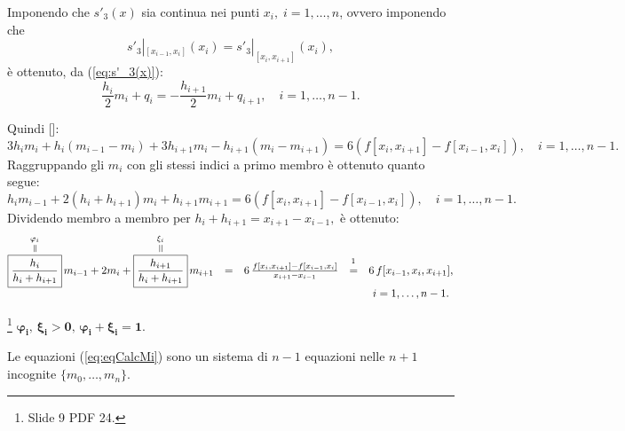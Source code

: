 Imponendo che $s'_3(x)$ sia continua nei punti $x_i,\; i=1,\hdots,n$, ovvero imponendo che
\begin{equation*}
    s'_3|_{[x_{i-1}, x_i]}(x_i)=s'_3|_{[x_i, x_{i+1}]}(x_i),
\end{equation*}
è ottenuto, da (\ref{eq:s'_3(x)}):
\begin{equation*}
    \frac{h_i}{2}m_i+q_i=-\frac{h_{i+1}}{2}m_i+q_{i+1},\quad i=1,\hdots,n-1.
\end{equation*}

Quindi [\footnotemark]:
\begin{equation*}
    3h_im_i+h_i(m_{i-1}-m_i)+3h_{i+1}m_i-h_{i+1}(m_i-m_{i+1})=6\left(f[x_i,x_{i+1}]-f[x_{i-1},x_i]\right),\quad i=1,\hdots,n-1.
\end{equation*}
Raggruppando gli $m_i$ con gli stessi indici a primo membro è ottenuto quanto segue:
\begin{equation*}
    h_im_{i-1}+2(h_i+h_{i+1})m_i+h_{i+1}m_{i+1}=6(f[x_i,x_{i+1}]-f[x_{i-1},x_i]),\quad i=1,\hdots,n-1.
\end{equation*}
Dividendo membro a membro per $h_i+h_{i+1}=x_{i+1}-x_{i-1},$ è ottenuto:
\begin{equation}\label{eq:eqCalcMi}
    \begin{matrix}
        \equaltoup{\boxed{\frac{h_i}{h_i+h_{i+1}}}}{\varphi_i}\,m_{i-1}+2m_i+\equaltoup{\boxed{\frac{h_{i+1}}{h_i+h_{i+1}}}}{\xi_i}\,m_{i+1}&=&6\,\frac{f[x_i,x_{i+1}]-f[x_{i-1},x_i]}{x_{i+1}-x_{i-1}}&\overset{\footnotemark}{=}&6\,f[x_{i-1},x_i,x_{i+1}],\\
        && && i=1,\hdots,n-1.
    \end{matrix}
\end{equation} 

\begin{remark}\label{re:varphi+xi=1}\footnote{Slide 9 PDF 24.}
    $\boldsymbol{\varphi_i,\, \xi_i>0,\, \varphi_i+\xi_i=1.}$
\end{remark}

Le equazioni (\ref{eq:eqCalcMi}) sono un sistema di $n-1$ equazioni nelle $n+1$ incognite $\{m_0,\hdots,m_n\}$.

